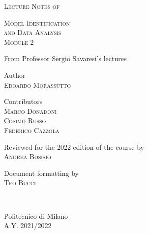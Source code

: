 \documentclass[10pt,a4paper,twoside]{book}
\begin{document}
\frontmatter

\pagestyle{empty}


\hypertarget{mytitlepage}{} %

\vspace*{\fill}
\begin{center}
	{\large \textsc{Lecture Notes of}}\\
	
  \vspace*{0.4cm}
	
  {\Huge
  \textsc{Model Identification}\\
	\vspace*{0.4cm}
	\textsc{and Data Analysis}}\\
	\vspace*{0.4cm}
	{\huge \textsc{Module 2}}\\
	
  \vspace*{1cm}
	
  {\large {From Professor Sergio Savaresi's lectures}}\\
	
  \vspace*{1cm}
	
  {\large
  Author\\
  \vspace*{0.1cm}
  \textsc{Edoardo Morassutto}\\
  
  \vspace*{0.4cm}
  
  Contributors\\
  \vspace*{0.1cm}
  \textsc{Marco Donadoni}\\
  \textsc{Cosimo Russo}\\
  \textsc{Federico Cazzola}\\
  
  \vspace*{0.4cm}
	
  Reviewed for the 2022 edition of the course by\\
  \vspace*{0.1cm}
  \textsc{Andrea Bosisio}\\

  \vspace*{0.4cm}
  
  Document formatting by\\
  \vspace*{0.1cm}
  \textsc{Teo Bucci}}\\
	
  \vspace*{1cm}
	
  Politecnico di Milano\\A.Y. 2021/2022
\end{center}
\vspace*{\fill}
\clearpage
\end{document}
